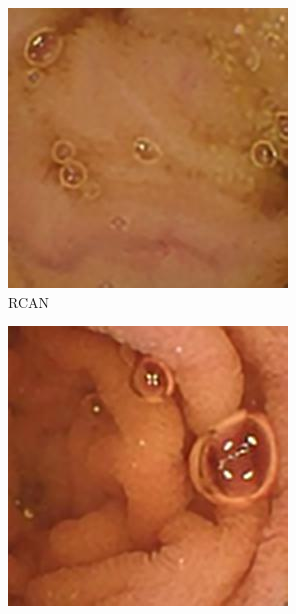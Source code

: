\begin{figure}[H]
    \begin{subfigure}[b]{0.275\textwidth}
    \includegraphics[width=\textwidth]{Chapter7/rcan_9.jpg}
    \caption{RCAN}
  \end{subfigure}
  \begin{subfigure}[b]{0.275\textwidth}
    \includegraphics[width=\textwidth]{Chapter5/rcan_445.jpg}

\end{subfigure}
\end{figure}
